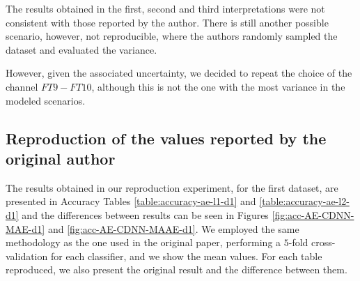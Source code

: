 The results obtained in the first, second and third interpretations were not consistent with those reported by the author. There is still another possible scenario, however, not reproducible, where the authors randomly sampled the dataset and evaluated the variance.

However, given the associated uncertainty, we decided to repeat the choice of the channel $FT9-FT10$, although this is not the one with the most variance in the modeled scenarios.


\subsection{Reproduction of the values reported by the original author}

The results obtained in our reproduction experiment, for the first dataset, are presented in Accuracy Tables \ref{table:accuracy-ae-l1-d1} and \ref{table:accuracy-ae-l2-d1} and the differences between results can be seen in Figures \ref{fig:acc-AE-CDNN-MAE-d1} and \ref{fig:acc-AE-CDNN-MAAE-d1}. We employed the same methodology as the one used in the original paper, performing a $5$-fold cross-validation for each classifier, and we show the mean values. For each table reproduced, we also present the original result and the difference between them.

\begin{table}[!ht]
\centering
{}
\caption{Accuracy values obtained in reproduction, AE-CDNN-MAE for Dataset 1.}
\label{table:accuracy-ae-l1-d1}
\end{table}

